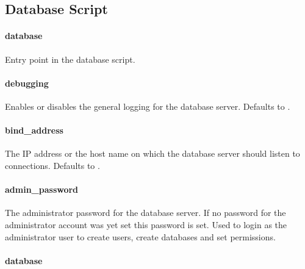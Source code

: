 \subsection{Database Script}

\paragraph{database}


Entry point in the database script.

\paragraph{debugging}


Enables or disables the general logging for the database server.
Defaults to \literalfalse.

\paragraph{bind\_address}


The IP address or the host name on which the database server should listen
to connections. Defaults to .

\paragraph{admin\_password}


The administrator password for the database server. If no password for
the administrator account was yet set this password is set. Used to login as
the administrator user to create users, create databases and set permissions.

\paragraph{database}

\\
\\
\\

